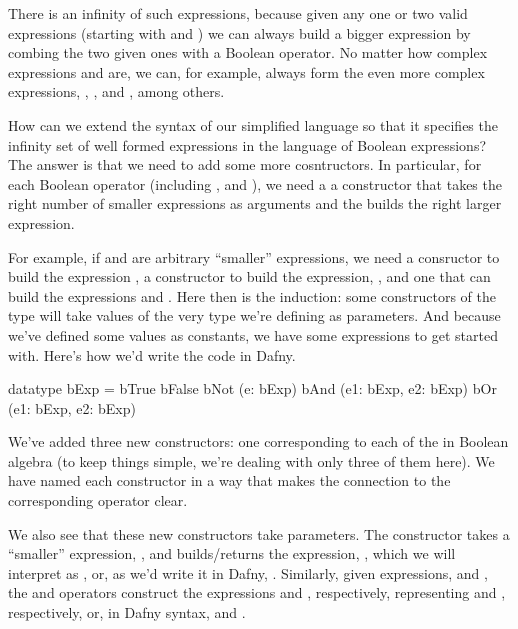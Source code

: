 \documentclass[letterpaper,10pt,english]{sphinxmanual}
\begin{document}
There is an infinity of such expressions, because given any one or two
valid expressions (starting with  and ) we can always
build a bigger expression by combing the two given ones with a Boolean
operator. No matter how complex expressions  and  are, we can,
for example, always form the even more complex expressions, , , and , among others.

How can we extend the syntax of our simplified language so that it
specifies the infinity set of well formed expressions in the language
of Boolean expressions? The answer is that we need to add some more
cosntructors. In particular, for each Boolean operator (including
, and ), we need a a constructor that takes the right
number of smaller expressions as arguments and the builds the right
larger expression.

For example, if  and  are arbitrary “smaller” expressions, we
need a consructor to build the expression , a constructor to
build the expression, , and one that can build the expressions
 and . Here then is the induction: some constructors of
the  type will take values of the very type we’re defining as
parameters. And because we’ve defined some values as constants, we
have some expressions to get started with. Here’s how we’d write the
code in Dafny.

\begin{sphinxVerbatim}[commandchars=\\\{\}]
datatype bExp =
     bTrue \textbar{}
     bFalse \textbar{}
     bNot (e: bExp) \textbar{}
     bAnd (e1: bExp, e2: bExp) \textbar{}
     bOr (e1: bExp, e2: bExp)
\end{sphinxVerbatim}

We’ve added three new constructors: one corresponding to each of the
 in Boolean algebra (to keep things simple, we’re dealing
with only three of them here). We have named each constructor in a way
that makes the connection to the corresponding operator clear.

We also see that these new constructors take parameters. The 
constructor takes a “smaller” expression, , and builds/returns the
expression, , which we will interpret as , or, as we’d
write it in Dafny, . Similarly, given expressions,  and ,
the  and  operators construct the expressions 
and , respectively, representing  and , respectively, or, in Dafny syntax,  and .
\end{document}
